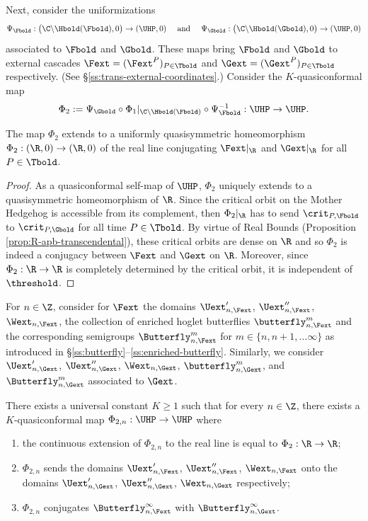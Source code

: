 \documentclass{amsart}
\begin{document}
Next, consider the uniformizations 
\[
\Psi_{\Fbold}: \big( \C \backslash \Hbold(\Fbold), 0 \big) \to (\UHP,0)
\quad \text{ and } \quad 
\Psi_{\Gbold}: \big( \C \backslash \Hbold(\Gbold), 0 \big) \to (\UHP,0)
\]
associated to $\Fbold$ and $\Gbold$. 
These maps bring $\Fbold$ and $\Gbold$ to external cascades $\Fext=(\Fext^P)_{P \in \Tbold}$ and $\Gext=(\Gext^P)_{P \in \Tbold}$ respectively.
(See \S\ref{ss:trans-external-coordinates}.)
Consider the $K$-quasiconformal map
\[
    \Phi_2 := \Psi_{\Gbold} \circ \Phi_1|_{\C \backslash \Hbold(\Fbold)} \circ \Psi_{\Fbold}^{-1} : \UHP \to \UHP.
\]

\begin{lemma}
\label{lem:qs-rigidity}
    The map $\Phi_2$ extends to a uniformly quasisymmetric homeomorphism $\Phi_2: (\R,0) \to (\R,0)$ of the real line conjugating $\Fext|_{\R}$ and $\Gext|_{\R}$ for all $P \in \Tbold$.
\end{lemma}

\begin{proof}
    As a quasiconformal self-map of $\UHP$, $\Phi_2$ uniquely extends to a quasisymmetric homeomorphism of $\R$.
    Since the critical orbit on the Mother Hedgehog is accessible from its complement, then $\Phi_2|_{\R}$ has to send $\crit_{P,\Fbold}$ to $\crit_{P,\Gbold}$ for all time $P \in \Tbold$. 
    By virtue of Real Bounds (Proposition \ref{prop:R-apb-transcendental}), these critical orbits are dense on $\R$ and so $\Phi_2$ is indeed a conjugacy between $\Fext$ and $\Gext$ on $\R$.
    Moreover, since $\Phi_2: \R \to \R$ is completely determined by the critical orbit, it is independent of $\threshold$.
\end{proof}

For $n \in \Z$, consider for $\Fext$ the domains $\Uext'_{n,\Fext}$, $\Uext''_{n,\Fext}$, $\Wext_{n,\Fext}$, the collection of enriched hoglet butterflies $\butterfly_{n,\Fext}^m$ and the corresponding semigroups $\Butterfly_{n,\Fext}^m$ for $m \in \{n,n+1,\ldots\infty\}$ as introduced in \S\ref{ss:butterfly}--\ref{ss:enriched-butterfly}.
Similarly, we consider
$\Uext'_{n,\Gext}$, $\Uext''_{n,\Gext}$, $\Wext_{n,\Gext}$, $\butterfly_{n,\Gext}^m$, and $\Butterfly_{n,\Gext}^m$ associated to $\Gext$.

\begin{lemma}
\label{lem:main-lemma}
    There exists a universal constant $K \geq 1$ such that for every $n \in \Z$, there exists a $K$-quasiconformal map $\Phi_{2,n}: \UHP \to \UHP$ where
    \begin{enumerate}
        \item the continuous extension of $\Phi_{2,n}$ to the real line is equal to $\Phi_2: \R \to \R$;
        \item $\Phi_{2,n}$ sends the domains $\Uext'_{n,\Fext}$, $\Uext''_{n,\Fext}$, $\Wext_{n,\Fext}$ onto the domains $\Uext'_{n,\Gext}$, $\Uext''_{n,\Gext}$, $\Wext_{n,\Gext}$ respectively;
        \item $\Phi_{2,n}$ conjugates $\Butterfly_{n,\Fext}^\infty$ with $\Butterfly_{n,\Gext}^\infty$.
    \end{enumerate}
\end{lemma}
\end{document}
